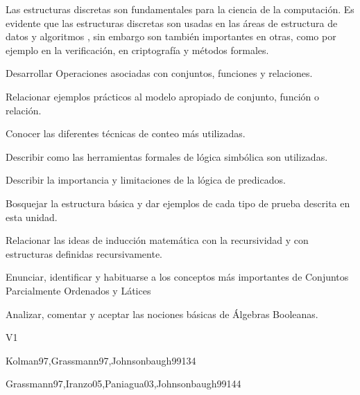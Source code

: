 \begin{syllabus}


\begin{justification}
Las estructuras discretas son fundamentales para la ciencia de la
computación. Es evidente que las estructuras discretas son usadas en
las áreas de estructura de datos y algoritmos , sin embargo son
también importantes en otras, como por ejemplo en la
verificación, en criptografía y métodos formales.
\end{justification}

\begin{goals}
\item Desarrollar Operaciones asociadas con conjuntos, funciones y relaciones.
\item Relacionar ejemplos prácticos al modelo apropiado de conjunto, función o relación.
\item Conocer las diferentes técnicas de conteo más utilizadas.
\item Describir como las herramientas formales de lógica simbólica son utilizadas.
\item Describir la importancia y limitaciones de la lógica de predicados.
\item Bosquejar la estructura básica y dar ejemplos de cada tipo de prueba descrita en esta unidad.
\item Relacionar las ideas de inducción matemática con la recursividad y con estructuras definidas recursivamente.
\item Enunciar, identificar y habituarse a los conceptos más importantes de Conjuntos Parcialmente Ordenados y Látices
\item Analizar, comentar y aceptar las nociones básicas de Álgebras Booleanas.
\end{goals}

\begin{outcomes}{V1}
\end{outcomes}

\begin{unit}{\DSFunctionsRelationsAndSetsDef}{}{Kolman97,Grassmann97,Johnsonbaugh99}{13}{4}
    \DSFunctionsRelationsAndSetsAllTopics
    \DSFunctionsRelationsAndSetsAllObjectives
\end{unit}

\begin{unit}{\DSBasicLogicDef}{}{Grassmann97,Iranzo05,Paniagua03,Johnsonbaugh99}{14}{4}
    \DSBasicLogicAllTopics
    \DSBasicLogicAllObjectives
\end{unit}


\end{syllabus}

